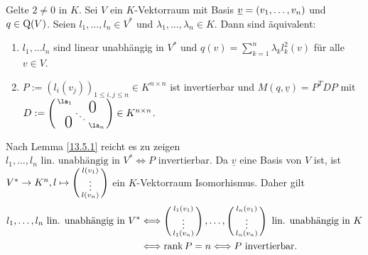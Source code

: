 \documentclass[../../main.tex]{subfiles}
\begin{document}
\begin{sat}\label{13.5.2}
Gelte $2\neq 0$ in $K$. Sei $V$ ein $K$-Vektorraum mit Basis ${\underline v}=(v_1,\ldots ,v_n)$ und $q\in \operatorname{Q}(V)$. Seien $l_1,\ldots ,l_n\in V^*$ und $\lambda_1,\ldots ,\lambda_n\in K$. Dann sind äquivalent:
\begin{enumerate}[\normalfont(a)]
\item $l_1,\ldots l_n$ sind linear unabhängig in $V^*$ und $q(v)=\sum_{k=1}^n\lambda_k l_k^2(v)$ für alle $v\in V$.
\item $P:=(l_i(v_j))_{1\le i,j\le n}\in K^{n\times n}$ ist invertierbar und $M(q,\underline{v})=P^TDP$  mit $D:=\left(\begin{smallmatrix}
\la_1 & & \llap{$\overset{\blap{\LARGE 0}}{~}$} \\
& \ddots &\\
\rlap{\tlap{\LARGE 0}} & & \la_n\end{smallmatrix}\right)\in K^{n\times n}$.
\end{enumerate}
\end{sat}
\begin{cproof}
Nach Lemma \ref{13.5.1} reicht es zu zeigen $l_1,\ldots ,l_n\text{ lin. unabhängig in }V^*\Longleftrightarrow P\text{ invertierbar}$. Da $\underline{v}$ eine Basis von $V$ ist, ist $V^*\to K^n, l\mapsto\left(\begin{smallmatrix}l(v_1)\\\vdots\\l(v_n)\end{smallmatrix}\right)$ ein $K$-Vektorraum Isomorhismus. Daher gilt
\begin{align*}
l_1,\ldots ,l_n\text{ lin. unabhängig in }V^*&\Longleftrightarrow\left(\begin{smallmatrix}l_1(v_1)\\\vdots\\l_1(v_n)\end{smallmatrix}\right),\ldots ,\left(\begin{smallmatrix}l_n(v_1)\\\vdots\\l_n(v_n)\end{smallmatrix}\right) \text{ lin. unabhängig in }K\\
&\Longleftrightarrow \operatorname{rank} P=n\Longleftrightarrow P\text{ invertierbar}.
\end{align*}
\end{cproof}
\end{document}
